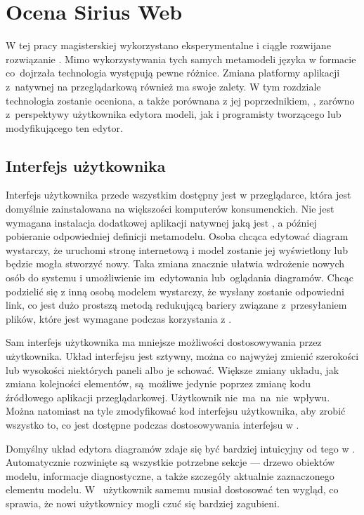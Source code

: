 \chapter{Ocena Sirius Web}

W tej pracy magisterskiej wykorzystano eksperymentalne i ciągle
rozwijane rozwiązanie \SiriusWeb{}.
Mimo wykorzystywania tych samych metamodeli języka \CAL{} w formacie \Ecore{}
co~dojrzała technologia
\SiriusDesktop{} występują pewne różnice. Zmiana platformy aplikacji z~natywnej
na przeglądarkową również ma swoje zalety. W tym rozdziale technologia
\SiriusWeb{} zostanie oceniona, a także porównana z jej poprzednikiem,
\SiriusDesktop{}, zarówno z~perspektywy użytkownika edytora modeli, jak i
programisty tworzącego lub modyfikującego ten edytor.

\section{Interfejs użytkownika}

Interfejs użytkownika \SiriusWeb{} przede wszystkim dostępny jest w
przeglądarce, która jest domyślnie zainstalowana
na większości komputerów konsumenckich. Nie jest wymagana instalacja dodatkowej
aplikacji natywnej jaką jest \SiriusDesktop{}, a później pobieranie
odpowiedniej definicji metamodelu. Osoba chcąca edytować diagram wystarczy, że
uruchomi stronę internetową i model zostanie jej wyświetlony lub będzie mogła
stworzyć nowy. Taka zmiana
znacznie ułatwia wdrożenie nowych osób do systemu i umożliwienie im~edytowania
lub~oglądania diagramów. Chcąc podzielić się z inną osobą modelem
wystarczy, że wysłany zostanie odpowiedni link, co jest dużo prostszą metodą
redukującą bariery związane z~przesyłaniem plików, które jest wymagane podczas
korzystania z \SiriusDesktop{}.

Sam interfejs użytkownika ma mniejsze możliwości dostosowywania przez
użytkownika. Układ
interfejsu jest sztywny, można co najwyżej zmienić szerokości lub wysokości
niektórych paneli albo je schować. Większe zmiany układu, jak zmiana kolejności
elementów, są~możliwe jedynie poprzez zmianę kodu źródłowego aplikacji
przeglądarkowej. Użytkownik nie~ma~na~nie~wpływu. Można natomiast na tyle
zmodyfikować kod interfejsu użytkownika, aby zrobić wszystko to, co jest
dostępne podczas dostosowywania interfejsu w \SiriusDesktop{}.

Domyślny układ edytora diagramów zdaje się być bardziej intuicyjny od tego w
\SiriusDesktop{}. Automatycznie rozwinięte są wszystkie potrzebne sekcje
--- drzewo obiektów modelu, informacje diagnostyczne, a także szczegóły
aktualnie zaznaczonego elementu modelu. W~\SiriusDesktop{} użytkownik
samemu musiał dostosować ten wygląd, co sprawia, że nowi użytkownicy mogli czuć
się bardziej zagubieni.

